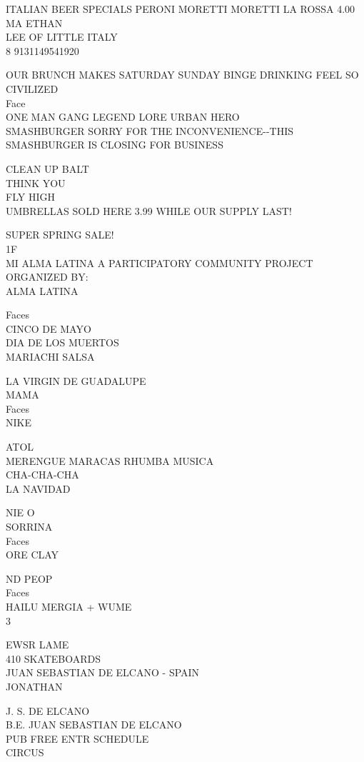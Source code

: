\documentclass[10pt,letterpaper]{article}
\begin{document}
ITALIAN BEER SPECIALS PERONI MORETTI MORETTI LA ROSSA 4.00\\
MA ETHAN\\
LEE OF LITTLE ITALY\\
8 9131149541920

OUR BRUNCH MAKES SATURDAY SUNDAY BINGE DRINKING FEEL SO CIVILIZED\\
Face\\
ONE MAN GANG LEGEND LORE URBAN HERO\\
SMASHBURGER SORRY FOR THE INCONVENIENCE{-}{-}THIS SMASHBURGER IS CLOSING FOR BUSINESS

CLEAN UP BALT\\
THINK YOU\\
FLY HIGH\\
UMBRELLAS SOLD HERE 3.99 WHILE OUR SUPPLY LAST!

SUPER SPRING SALE!\\
1F\\
MI ALMA LATINA A PARTICIPATORY COMMUNITY PROJECT ORGANIZED BY:\\
ALMA LATINA

Faces\\
CINCO DE MAYO\\
DIA DE LOS MUERTOS\\
MARIACHI SALSA

LA VIRGIN DE GUADALUPE\\
MAMA\\
Faces\\
NIKE

ATOL\\
MERENGUE MARACAS RHUMBA MUSICA\\
CHA{-}CHA{-}CHA\\
LA NAVIDAD

NIE O\\
SORRINA\\
Faces\\
ORE CLAY

ND PEOP\\
Faces\\
HAILU MERGIA + WUME\\
3

EWSR LAME\\
410 SKATEBOARDS\\
JUAN SEBASTIAN DE ELCANO {-} SPAIN\\
JONATHAN

J. S. DE ELCANO\\
B.E. JUAN SEBASTIAN DE ELCANO\\
PUB FREE ENTR SCHEDULE\\
CIRCUS
\end{document}

